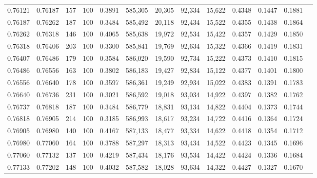 \begin{tabular}{rrrrrrrrrrrrr}
0.76121 & 0.76187 &   157 & 100 &                                     0.3891 & 585,305 &  20,305 &  92,334 &  15,622 & 0.4348 & 0.1447 & 0.1881 \\
0.76187 & 0.76262 &   187 & 100 &                                     0.3484 & 585,492 &  20,118 &  92,434 &  15,522 & 0.4355 & 0.1438 & 0.1864 \\
0.76262 & 0.76318 &   146 & 100 &                                     0.4065 & 585,638 &  19,972 &  92,534 &  15,422 & 0.4357 & 0.1429 & 0.1850 \\
0.76318 & 0.76406 &   203 & 100 &                                     0.3300 & 585,841 &  19,769 &  92,634 &  15,322 & 0.4366 & 0.1419 & 0.1831 \\
0.76407 & 0.76486 &   179 & 100 &                                     0.3584 & 586,020 &  19,590 &  92,734 &  15,222 & 0.4373 & 0.1410 & 0.1815 \\
0.76486 & 0.76556 &   163 & 100 &                                     0.3802 & 586,183 &  19,427 &  92,834 &  15,122 & 0.4377 & 0.1401 & 0.1800 \\
0.76556 & 0.76640 &   178 & 100 &                                     0.3597 & 586,361 &  19,249 &  92,934 &  15,022 & 0.4383 & 0.1391 & 0.1783 \\
0.76640 & 0.76736 &   231 & 100 &                                     0.3021 & 586,592 &  19,018 &  93,034 &  14,922 & 0.4397 & 0.1382 & 0.1762 \\
0.76737 & 0.76818 &   187 & 100 &                                     0.3484 & 586,779 &  18,831 &  93,134 &  14,822 & 0.4404 & 0.1373 & 0.1744 \\
0.76818 & 0.76905 &   214 & 100 &                                     0.3185 & 586,993 &  18,617 &  93,234 &  14,722 & 0.4416 & 0.1364 & 0.1724 \\
0.76905 & 0.76980 &   140 & 100 &                                     0.4167 & 587,133 &  18,477 &  93,334 &  14,622 & 0.4418 & 0.1354 & 0.1712 \\
0.76980 & 0.77060 &   164 & 100 &                                     0.3788 & 587,297 &  18,313 &  93,434 &  14,522 & 0.4423 & 0.1345 & 0.1696 \\
0.77060 & 0.77132 &   137 & 100 &                                     0.4219 & 587,434 &  18,176 &  93,534 &  14,422 & 0.4424 & 0.1336 & 0.1684 \\
0.77133 & 0.77202 &   148 & 100 &                                     0.4032 & 587,582 &  18,028 &  93,634 &  14,322 & 0.4427 & 0.1327 & 0.1670 \\

\end{tabular}
